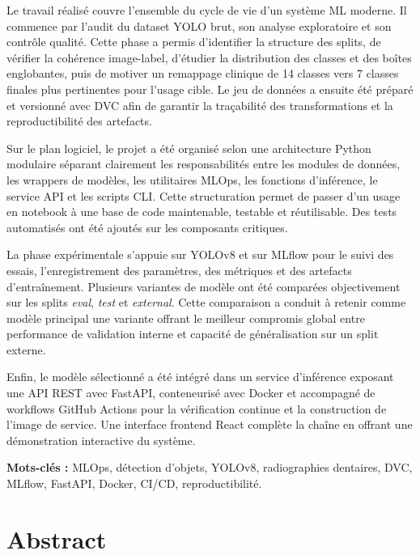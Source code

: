 \documentclass[a4paper,12pt]{report}
\begin{document}
Le travail r\'ealis\'e couvre l'ensemble du cycle de vie d'un syst\`eme ML moderne. Il commence par l'audit du dataset YOLO brut, son analyse exploratoire et son contr\^ole qualit\'e. Cette phase a permis d'identifier la structure des splits, de v\'erifier la coh\'erence image-label, d'\'etudier la distribution des classes et des bo\^ites englobantes, puis de motiver un remappage clinique de 14 classes vers 7 classes finales plus pertinentes pour l'usage cible. Le jeu de donn\'ees a ensuite \'et\'e pr\'epar\'e et versionn\'e avec DVC afin de garantir la tra\c{c}abilit\'e des transformations et la reproductibilit\'e des artefacts.

Sur le plan logiciel, le projet a \'et\'e organis\'e selon une architecture Python modulaire s\'eparant clairement les responsabilit\'es entre les modules de donn\'ees, les wrappers de mod\`eles, les utilitaires MLOps, les fonctions d'inf\'erence, le service API et les scripts CLI. Cette structuration permet de passer d'un usage en notebook \`a une base de code maintenable, testable et r\'eutilisable. Des tests automatis\'es ont \'et\'e ajout\'es sur les composants critiques.

La phase exp\'erimentale s'appuie sur YOLOv8 et sur MLflow pour le suivi des essais, l'enregistrement des param\`etres, des m\'etriques et des artefacts d'entra\^inement. Plusieurs variantes de mod\`ele ont \'et\'e compar\'ees objectivement sur les splits \textit{eval}, \textit{test} et \textit{external}. Cette comparaison a conduit \`a retenir comme mod\`ele principal une variante offrant le meilleur compromis global entre performance de validation interne et capacit\'e de g\'en\'eralisation sur un split externe.

Enfin, le mod\`ele s\'electionn\'e a \'et\'e int\'egr\'e dans un service d'inf\'erence exposant une API REST avec FastAPI, conteneuris\'e avec Docker et accompagn\'e de workflows GitHub Actions pour la v\'erification continue et la construction de l'image de service. Une interface frontend React compl\`ete la cha\^ine en offrant une d\'emonstration interactive du syst\`eme.

\textbf{Mots-cl\'es :} MLOps, d\'etection d'objets, YOLOv8, radiographies dentaires, DVC, MLflow, FastAPI, Docker, CI/CD, reproductibilit\'e.

\chapter*{Abstract}
\end{document}
